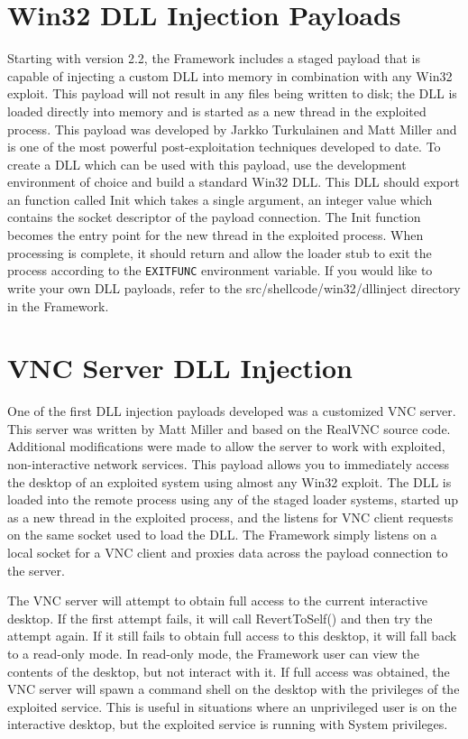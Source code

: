 \documentclass{report}
\begin{document}
\section{Win32 DLL Injection Payloads}
\par
Starting with version 2.2, the Framework includes a staged payload that is
capable of injecting a custom DLL into memory in combination with any Win32
exploit. This payload will not result in any files being written to disk; the
DLL is loaded directly into memory and is started as a new thread in the
exploited process. This payload was developed by Jarkko Turkulainen and Matt
Miller and is one of the most powerful post-exploitation techniques developed
to date. To create a DLL which can be used with this payload, use the
development environment of choice and build a standard Win32 DLL. This DLL
should export an function called Init which takes a single argument, an
integer value which contains the socket descriptor of the payload connection.
The Init function becomes the entry point for the new thread in the exploited
process. When processing is complete, it should return and allow the loader
stub to exit the process according to the \texttt{EXITFUNC} environment
variable. If you would like to write your own DLL payloads, refer to the
src/shellcode/win32/dllinject directory in the Framework. 

\section{VNC Server DLL Injection}
\par
One of the first DLL injection payloads developed was a customized VNC server.
This server was written by Matt Miller and based on the RealVNC source code.
Additional modifications were made to allow the server to work with exploited,
non-interactive network services. This payload allows you to immediately access
the desktop of an exploited system using almost any Win32 exploit. The DLL is
loaded into the remote process using any of the staged loader systems, started
up as a new thread in the exploited process, and the listens for VNC client
requests on the same socket used to load the DLL. The Framework simply listens
on a local socket for a VNC client and proxies data across the payload
connection to the server.  

\par
The VNC server will attempt to obtain full access to the current interactive
desktop. If the first attempt fails, it will call RevertToSelf() and then try
the attempt again. If it still fails to obtain full access to this desktop, it
will fall back to a read-only mode. In read-only mode, the Framework user can
view the contents of the desktop, but not interact with it. If full access was
obtained, the VNC server will spawn a command shell on the desktop with the
privileges of the exploited service. This is useful in situations where an
unprivileged user is on the interactive desktop, but the exploited service is
running with System privileges.  
\end{document}
